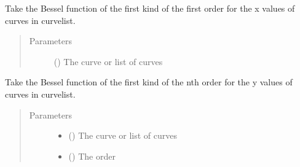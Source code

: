 \documentclass[letterpaper,10pt,english]{sphinxmanual}
\begin{document}
\begin{fulllineitems}
\label{\detokenize{pydv:pydvpy.j1x}}
Take the Bessel function of the first kind of the first order for the x values of
curves in curvelist.
\begin{quote}\begin{description}
\item[{Parameters}] \leavevmode
{} () \textendash{} The curve or list of curves

\end{description}\end{quote}

\end{fulllineitems}


\begin{fulllineitems}
\label{\detokenize{pydv:pydvpy.jn}}
Take the Bessel function of the first kind of the nth order for the y values of
curves in curvelist.
\begin{quote}\begin{description}
\item[{Parameters}] \leavevmode\begin{itemize}
\item {} 
 () \textendash{} The curve or list of curves

\item {} 
 () \textendash{} The order

\end{itemize}

\end{description}\end{quote}

\end{fulllineitems}
\end{document}
